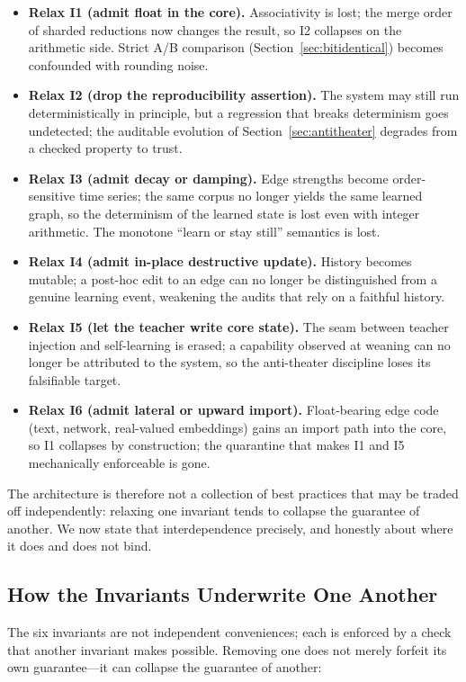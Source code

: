 \documentclass[11pt,a4paper]{article}
\begin{document}
\begin{itemize}[leftmargin=*]
\item \textbf{Relax I1 (admit float in the core).} Associativity is lost;
the merge order of sharded reductions now changes the result, so I2
collapses on the arithmetic side. Strict A/B comparison
(Section~\ref{sec:bitidentical}) becomes confounded with rounding noise.
\item \textbf{Relax I2 (drop the reproducibility assertion).} The system
may still run deterministically in principle, but a regression that
breaks determinism goes undetected; the auditable evolution of
Section~\ref{sec:antitheater} degrades from a checked property to trust.
\item \textbf{Relax I3 (admit decay or damping).} Edge strengths become
order-sensitive time series; the same corpus no longer yields the same
learned graph, so the determinism of the learned state is lost even with
integer arithmetic. The monotone ``learn or stay still'' semantics is lost.
\item \textbf{Relax I4 (admit in-place destructive update).} History
becomes mutable; a post-hoc edit to an edge can no longer be
distinguished from a genuine learning event, weakening the audits that
rely on a faithful history.
\item \textbf{Relax I5 (let the teacher write core state).} The seam
between teacher injection and self-learning is erased; a capability
observed at weaning can no longer be attributed to the system, so the
anti-theater discipline loses its falsifiable target.
\item \textbf{Relax I6 (admit lateral or upward import).} Float-bearing
edge code (text, network, real-valued embeddings) gains an import path
into the core, so I1 collapses by construction; the quarantine that
makes I1 and I5 mechanically enforceable is gone.
\end{itemize}

The architecture is therefore not a collection of best practices that
may be traded off independently: relaxing one invariant tends to collapse
the guarantee of another. We now state that interdependence precisely,
and honestly about where it does and does not bind.

\subsection{How the Invariants Underwrite One Another}
\label{sec:invariants-nonsep}

The six invariants are not independent conveniences; each is enforced by a
check that another invariant makes possible. Removing one does not merely
forfeit its own guarantee---it can collapse the guarantee of another:
\end{document}
